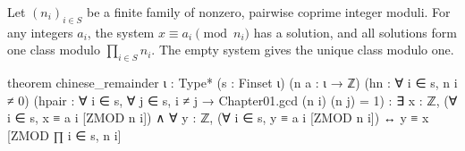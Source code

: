 \begin{theorem}
  \label{ent:thm:chinese-remainder}
  Let $(n_i)_{i\in S}$ be a finite family of nonzero, pairwise coprime integer moduli.
  For any integers $a_i$, the system $x\equiv a_i\pmod{n_i}$ has a solution, and all solutions form
  one class modulo $\prod_{i\in S}n_i$.
  The empty system gives the unique class modulo one.

  \begin{lean}
    theorem chinese_remainder {ι : Type*} (s : Finset ι) (n a : ι → ℤ)
        (hn : ∀ i ∈ s, n i ≠ 0)
        (hpair : ∀ i ∈ s, ∀ j ∈ s, i ≠ j → Chapter01.gcd (n i) (n j) = 1) :
        ∃ x : ℤ, (∀ i ∈ s, x ≡ a i [ZMOD n i]) ∧
          ∀ y : ℤ, (∀ i ∈ s, y ≡ a i [ZMOD n i]) ↔ y ≡ x [ZMOD ∏ i ∈ s, n i]
  \end{lean}
\end{theorem}

